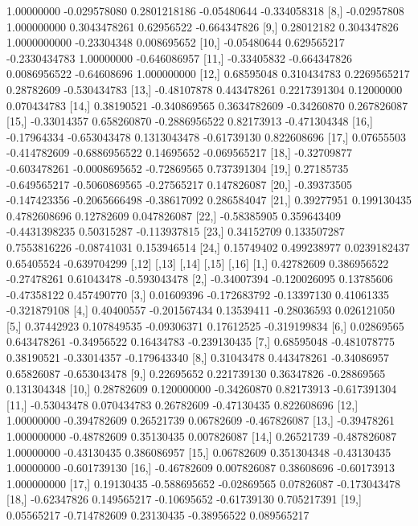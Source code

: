 \documentclass[a4paper, 12pt]{article}
\begin{document}
\begin{table}[H]
\begin{Schunk}
\begin{Soutput}
 [7,]  1.00000000 -0.029578080  0.2801218186 -0.05480644 -0.334058318
 [8,] -0.02957808  1.000000000  0.3043478261  0.62956522 -0.664347826
 [9,]  0.28012182  0.304347826  1.0000000000 -0.23304348  0.008695652
[10,] -0.05480644  0.629565217 -0.2330434783  1.00000000 -0.646086957
[11,] -0.33405832 -0.664347826  0.0086956522 -0.64608696  1.000000000
[12,]  0.68595048  0.310434783  0.2269565217  0.28782609 -0.530434783
[13,] -0.48107878  0.443478261  0.2217391304  0.12000000  0.070434783
[14,]  0.38190521 -0.340869565  0.3634782609 -0.34260870  0.267826087
[15,] -0.33014357  0.658260870 -0.2886956522  0.82173913 -0.471304348
[16,] -0.17964334 -0.653043478  0.1313043478 -0.61739130  0.822608696
[17,]  0.07655503 -0.414782609 -0.6886956522  0.14695652 -0.069565217
[18,] -0.32709877 -0.603478261 -0.0008695652 -0.72869565  0.737391304
[19,]  0.27185735 -0.649565217 -0.5060869565 -0.27565217  0.147826087
[20,] -0.39373505 -0.147423356 -0.2065666498 -0.38617092  0.286584047
[21,]  0.39277951  0.199130435  0.4782608696  0.12782609  0.047826087
[22,] -0.58385905  0.359643409 -0.4431398235  0.50315287 -0.113937815
[23,]  0.34152709  0.133507287  0.7553816226 -0.08741031  0.153946514
[24,]  0.15749402  0.499238977  0.0239182437  0.65405524 -0.639704299
            [,12]        [,13]       [,14]       [,15]        [,16]
 [1,]  0.42782609  0.386956522 -0.27478261  0.61043478 -0.593043478
 [2,] -0.34007394 -0.120026095  0.13785606 -0.47358122  0.457490770
 [3,]  0.01609396 -0.172683792 -0.13397130  0.41061335 -0.321879108
 [4,]  0.40400557 -0.201567434  0.13539411 -0.28036593  0.026121050
 [5,]  0.37442923  0.107849535 -0.09306371  0.17612525 -0.319199834
 [6,]  0.02869565  0.643478261 -0.34956522  0.16434783 -0.239130435
 [7,]  0.68595048 -0.481078775  0.38190521 -0.33014357 -0.179643340
 [8,]  0.31043478  0.443478261 -0.34086957  0.65826087 -0.653043478
 [9,]  0.22695652  0.221739130  0.36347826 -0.28869565  0.131304348
[10,]  0.28782609  0.120000000 -0.34260870  0.82173913 -0.617391304
[11,] -0.53043478  0.070434783  0.26782609 -0.47130435  0.822608696
[12,]  1.00000000 -0.394782609  0.26521739  0.06782609 -0.467826087
[13,] -0.39478261  1.000000000 -0.48782609  0.35130435  0.007826087
[14,]  0.26521739 -0.487826087  1.00000000 -0.43130435  0.386086957
[15,]  0.06782609  0.351304348 -0.43130435  1.00000000 -0.601739130
[16,] -0.46782609  0.007826087  0.38608696 -0.60173913  1.000000000
[17,]  0.19130435 -0.588695652 -0.02869565  0.07826087 -0.173043478
[18,] -0.62347826  0.149565217 -0.10695652 -0.61739130  0.705217391
[19,]  0.05565217 -0.714782609  0.23130435 -0.38956522  0.089565217

\end{Soutput}
\end{Schunk}
\end{table}
\end{document}

